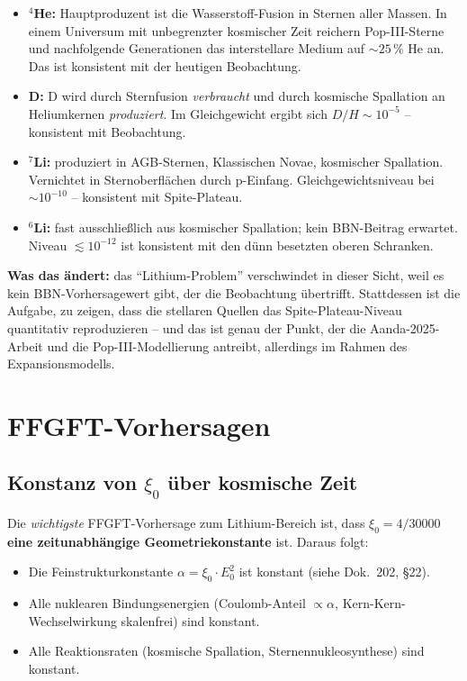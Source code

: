 \begin{itemize}[leftmargin=2em,itemsep=2pt,topsep=2pt]
  \item \textbf{$^4$He:} Hauptproduzent ist die Wasserstoff-Fusion in
        Sternen aller Massen. In einem Universum mit unbegrenzter
        kosmischer Zeit reichern Pop-III-Sterne und nachfolgende
        Generationen das interstellare Medium auf $\sim 25\,\%$ He
        an. Das ist konsistent mit der heutigen Beobachtung.
  \item \textbf{D:} D wird durch Sternfusion \emph{verbraucht} und
        durch kosmische Spallation an Heliumkernen \emph{produziert}.
        Im Gleichgewicht ergibt sich $D/H \sim 10^{-5}$ -- konsistent
        mit Beobachtung.
  \item \textbf{$^7$Li:} produziert in AGB-Sternen, Klassischen
        Novae, kosmischer Spallation. Vernichtet in Sternoberflächen
        durch p-Einfang. Gleichgewichtsniveau bei $\sim 10^{-10}$ --
        konsistent mit Spite-Plateau.
  \item \textbf{$^6$Li:} fast ausschließlich aus kosmischer
        Spallation; kein BBN-Beitrag erwartet. Niveau $\lesssim
        10^{-12}$ ist konsistent mit den dünn besetzten oberen
        Schranken.
\end{itemize}

\textbf{Was das ändert:} das \enquote{Lithium-Problem} verschwindet
in dieser Sicht, weil es kein BBN-Vorhersagewert gibt, der die
Beobachtung übertrifft. Stattdessen ist die Aufgabe, zu zeigen, dass
die stellaren Quellen das Spite-Plateau-Niveau quantitativ
reproduzieren -- und das ist genau der Punkt, der die Aanda-2025-Arbeit
und die Pop-III-Modellierung antreibt, allerdings im Rahmen des
Expansionsmodells.

\section{FFGFT-Vorhersagen}

\subsection{\texorpdfstring{Konstanz von $\xi_0$ über kosmische Zeit}{Konstanz von xi_0 ueber kosmische Zeit}}

Die \emph{wichtigste} FFGFT-Vorhersage zum Lithium-Bereich ist,
dass $\xi_0 = 4/30000$ \textbf{eine zeitunabhängige
Geometriekonstante} ist. Daraus folgt:
\begin{itemize}[leftmargin=2em,itemsep=2pt,topsep=2pt]
  \item Die Feinstrukturkonstante $\alpha = \xi_0 \cdot E_0^2$
        ist konstant (siehe Dok.~202, §22).
  \item Alle nuklearen Bindungsenergien (Coulomb-Anteil $\propto
        \alpha$, Kern-Kern-Wechselwirkung skalenfrei) sind
        konstant.
  \item Alle Reaktionsraten (kosmische Spallation,
        Sternennukleosynthese) sind konstant.
\end{itemize}

